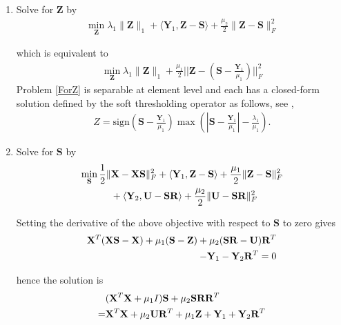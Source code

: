 \documentclass{article}
\begin{document}
\begin{enumerate}

 \item Solve for $\mathbf Z$ by
\begin{align*}
 \min_{\mathbf Z} \lambda_1 \|\mathbf Z\|_{1} + \langle \mathbf Y_1, \mathbf Z - \mathbf S\rangle + \frac{\mu_2}2\|\mathbf Z - \mathbf S\|^2_F
\end{align*}

which is equivalent to
\begin{align}
\min_{\mathbf Z} \lambda_1 \|\mathbf Z\|_{1} + \frac{\mu_1}{2}||\mathbf Z - (\mathbf S - \frac{\mathbf Y_1}{\mu_1})||^2_F
\label{ForZ}
\end{align}
Problem \eqref{ForZ} is separable at element level and each has a closed-form solution defined by the soft thresholding operator as follows, see \cite{bach2011convex, liu2010efficient},
\begin{align}
\label{SolutionZ_relaxed}
Z = \textrm{sign}\left(\mathbf S - \frac{\mathbf Y_1}{\mu_1}\right) \max\left(\left|\mathbf S - \frac{\mathbf Y_1}{\mu_1}\right| - \frac{\lambda_1}{\mu_1}\right).
\end{align}

\item Solve for $\mathbf S$ by
\begin{align*}
 \min_{\mathbf S} \frac12\|&\mathbf X -  \mathbf X\mathbf S\|^2_F + \langle \mathbf Y_1, \mathbf Z - \mathbf S\rangle +\frac{\mu_1}2\|\mathbf Z - \mathbf S\|^2_F \notag\\
&+ \langle \mathbf Y_2, \mathbf U - \mathbf S\mathbf R\rangle +\frac{\mu_2}2\|\mathbf U - \mathbf S\mathbf R\|^2_F
\end{align*}

Setting the derivative of the above objective with respect to $\mathbf S$ to zero gives
\begin{align}
 \mathbf X^T(\mathbf X\mathbf S - \mathbf X) + \mu_1 (\mathbf S - \mathbf Z) + \mu_2(\mathbf S\mathbf R - \mathbf U)\mathbf R^T \notag\\
 - \mathbf Y_1 - \mathbf Y_2\mathbf R^T = 0
\end{align}
 
hence the solution is
\begin{align}
\label{sylvester}
 &(\mathbf X^T\mathbf X +\mu_1 I) \mathbf S + \mu_2 \mathbf S \mathbf R\mathbf R^T \\
 =& \mathbf X^T\mathbf X+ \mu_2\mathbf U\mathbf R^T + \mu_1 \mathbf Z + \mathbf Y_1 + \mathbf Y_2\mathbf R^T \notag
\end{align}
 

\end{enumerate}
\end{document}
